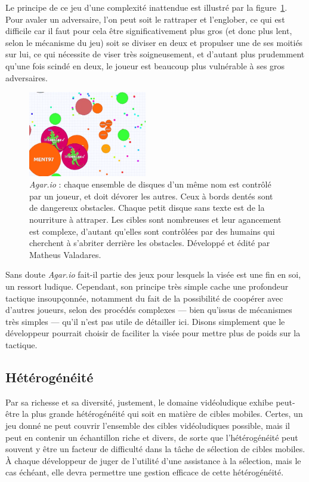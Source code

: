 	Le principe de ce jeu d'une complexité inattendue est illustré par la figure~\ref{fig:agario}. Pour avaler un adversaire, l'on peut soit le rattraper et l'englober, ce qui est difficile car il faut pour cela être significativement plus gros (et donc plus lent, selon le mécanisme du jeu) soit se diviser en deux et propulser une de ses moitiés sur lui, ce qui nécessite de viser très soigneusement, et d'autant plus prudemment qu'une fois scindé en deux, le joueur est beaucoup plus vulnérable à ses gros adversaires.
	
	\begin{figure}
		\centering
		\includegraphics[width=0.46\textwidth]{figures/ch1/agario}
		\caption[\emph{Agar.io}]{\emph{Agar.io} : chaque ensemble de disques d'un même nom est contrôlé par un joueur, et doit dévorer les autres. Ceux à bords dentés sont de dangereux obstacles. Chaque petit disque sans texte est de la nourriture à attraper. Les cibles sont nombreuses et leur agancement est complexe, d'autant qu'elles sont contrôlées par des humains qui cherchent à s'abriter derrière les obstacles. Développé et édité par Matheus Valadares.}
		\label{fig:agario}
	\end{figure}
	
	
	Sans doute \emph{Agar.io} fait-il partie des jeux pour lesquels la visée est une fin en soi, un ressort ludique. Cependant, son principe très simple cache une profondeur tactique insoupçonnée, notamment du fait de la possibilité de coopérer avec d'autres joueurs, selon des procédés complexes --- bien qu'issus de mécanismes très simples --- qu'il n'est pas utile de détailler ici. Disons simplement que le développeur pourrait choisir de faciliter la visée pour mettre plus de poids sur la tactique.
	
	\subsection{Hétérogénéité}
	Par sa richesse et sa diversité, justement, le domaine vidéoludique exhibe peut-être la plus grande hétérogénéité qui soit en matière de cibles mobiles. Certes, un jeu donné ne peut couvrir l'ensemble des cibles vidéoludiques possible, mais il peut en contenir un échantillon riche et divers, de sorte que l'hétérogénéité peut souvent y être un facteur de difficulté dans la tâche de sélection de cibles mobiles. À chaque développeur de juger de l'utilité d'une assistance à la sélection, mais le cas échéant, elle devra permettre une gestion efficace de cette hétérogénéité. 

